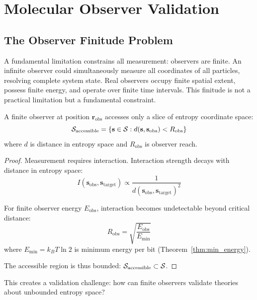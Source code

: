 \section{Molecular Observer Validation}
\label{sec:molecular_observer}

\subsection{The Observer Finitude Problem}

A fundamental limitation constrains all measurement: observers are finite. An infinite observer could simultaneously measure all coordinates of all particles, resolving complete system state. Real observers occupy finite spatial extent, possess finite energy, and operate over finite time intervals. This finitude is not a practical limitation but a fundamental constraint.

\begin{proposition}
\label{prop:observer_slice}
A finite observer at position $\mathbf{r}_{\text{obs}}$ accesses only a slice of entropy coordinate space:
\begin{equation}
\mathcal{S}_{\text{accessible}} = \{\mathbf{s} \in \mathcal{S} : d(\mathbf{s}, \mathbf{s}_{\text{obs}}) < R_{\text{obs}}\}
\end{equation}
where $d$ is distance in entropy space and $R_{\text{obs}}$ is observer reach.
\end{proposition}

\begin{proof}
Measurement requires interaction. Interaction strength decays with distance in entropy space:
\begin{equation}
I(\mathbf{s}_{\text{obs}}, \mathbf{s}_{\text{target}}) \propto \frac{1}{d(\mathbf{s}_{\text{obs}}, \mathbf{s}_{\text{target}})^2}
\end{equation}

For finite observer energy $E_{\text{obs}}$, interaction becomes undetectable beyond critical distance:
\begin{equation}
R_{\text{obs}} = \sqrt{\frac{E_{\text{obs}}}{E_{\min}}}
\end{equation}
where $E_{\min} = k_B T \ln 2$ is minimum energy per bit (Theorem~\ref{thm:min_energy}).

The accessible region is thus bounded: $\mathcal{S}_{\text{accessible}} \subset \mathcal{S}$.
\end{proof}

This creates a validation challenge: how can finite observers validate theories about unbounded entropy space?

